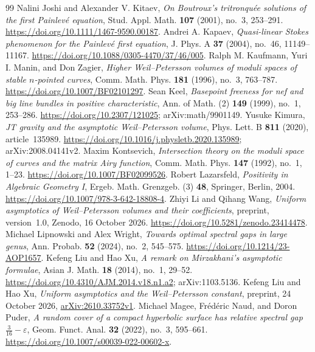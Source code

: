 \begin{thebibliography}{99}
 Nalini Joshi and Alexander V. Kitaev, \emph{On Boutroux's tritronqu\'ee solutions of the first Painlev\'e equation}, Stud. Appl. Math. \textbf{107} (2001), no.~3, 253--291. \url{https://doi.org/10.1111/1467-9590.00187}.
 Andrei A. Kapaev, \emph{Quasi-linear Stokes phenomenon for the Painlev\'e first equation}, J. Phys. A \textbf{37} (2004), no.~46, 11149--11167. \url{https://doi.org/10.1088/0305-4470/37/46/005}.
 Ralph M. Kaufmann, Yuri I. Manin, and Don Zagier, \emph{Higher Weil--Petersson volumes of moduli spaces of stable $n$-pointed curves}, Comm. Math. Phys. \textbf{181} (1996), no.~3, 763--787. \url{https://doi.org/10.1007/BF02101297}.
 Sean Keel, \emph{Basepoint freeness for nef and big line bundles in positive characteristic}, Ann. of Math. (2) \textbf{149} (1999), no.~1, 253--286. \url{https://doi.org/10.2307/121025}; arXiv:math/9901149.
 Yusuke Kimura, \emph{JT gravity and the asymptotic Weil--Petersson volume}, Phys. Lett. B \textbf{811} (2020), article~135989. \url{https://doi.org/10.1016/j.physletb.2020.135989}; arXiv:2008.04141v2.
 Maxim Kontsevich, \emph{Intersection theory on the moduli space of curves and the matrix Airy function}, Comm. Math. Phys. \textbf{147} (1992), no.~1, 1--23. \url{https://doi.org/10.1007/BF02099526}.
 Robert Lazarsfeld, \emph{Positivity in Algebraic Geometry I}, Ergeb. Math. Grenzgeb. (3) \textbf{48}, Springer, Berlin, 2004. \url{https://doi.org/10.1007/978-3-642-18808-4}.
 Zhiyi Li and Qihang Wang, \emph{Uniform asymptotics of Weil--Petersson volumes and their coefficients}, preprint, version~1.0, Zenodo, 16 October 2026. \url{https://doi.org/10.5281/zenodo.23414478}.
 Michael Lipnowski and Alex Wright, \emph{Towards optimal spectral gaps in large genus}, Ann. Probab. \textbf{52} (2024), no.~2, 545--575. \url{https://doi.org/10.1214/23-AOP1657}.
 Kefeng Liu and Hao Xu, \emph{A remark on Mirzakhani's asymptotic formulae}, Asian J. Math. \textbf{18} (2014), no.~1, 29--52. \url{https://doi.org/10.4310/AJM.2014.v18.n1.a2}; arXiv:1103.5136.
 Kefeng Liu and Hao Xu, \emph{Uniform asymptotics and the Weil--Petersson constant}, preprint, 24 October 2026, \href{https://arxiv.org/abs/2610.33752v1}{arXiv:2610.33752v1}.
 Michael Magee, Fr\'ed\'eric Naud, and Doron Puder, \emph{A random cover of a compact hyperbolic surface has relative spectral gap $\frac{3}{16}-\varepsilon$}, Geom. Funct. Anal. \textbf{32} (2022), no.~3, 595--661. \url{https://doi.org/10.1007/s00039-022-00602-x}.

\end{thebibliography}
